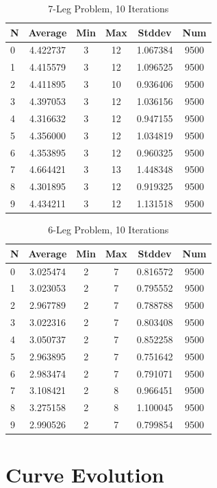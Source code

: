 \documentclass{article}
\begin{document}
\begin{table}
\centering
\begin{tabular}{|l|c|c|c|c|c|}
\hline
N & Average & Min & Max & Stddev & Num \\
\hline
0 & 4.422737 & 3 & 12 & 1.067384 & 9500 \\ 
1 & 4.415579 & 3 & 12 & 1.096525 & 9500 \\ 
2 & 4.411895 & 3 & 10 & 0.936406 & 9500 \\ 
3 & 4.397053 & 3 & 12 & 1.036156 & 9500 \\ 
4 & 4.316632 & 3 & 12 & 0.947155 & 9500 \\ 
5 & 4.356000 & 3 & 12 & 1.034819 & 9500 \\ 
6 & 4.353895 & 3 & 12 & 0.960325 & 9500 \\ 
7 & 4.664421 & 3 & 13 & 1.448348 & 9500 \\ 
8 & 4.301895 & 3 & 12 & 0.919325 & 9500 \\ 
9 & 4.434211 & 3 & 12 & 1.131518 & 9500 \\
\hline
\end{tabular}
\caption{7-Leg Problem, 10 Iterations}
\label{tab:template}
\end{table}

\begin{table}
\centering
\begin{tabular}{|l|c|c|c|c|c|}
\hline
N & Average & Min & Max & Stddev & Num \\
\hline
0 & 3.025474 & 2 & 7 & 0.816572 & 9500 \\ 
1 & 3.023053 & 2 & 7 & 0.795552 & 9500 \\ 
2 & 2.967789 & 2 & 7 & 0.788788 & 9500 \\ 
3 & 3.022316 & 2 & 7 & 0.803408 & 9500 \\ 
4 & 3.050737 & 2 & 7 & 0.852258 & 9500 \\ 
5 & 2.963895 & 2 & 7 & 0.751642 & 9500 \\ 
6 & 2.983474 & 2 & 7 & 0.791071 & 9500 \\ 
7 & 3.108421 & 2 & 8 & 0.966451 & 9500 \\ 
8 & 3.275158 & 2 & 8 & 1.100045 & 9500 \\ 
9 & 2.990526 & 2 & 7 & 0.799854 & 9500 \\
\hline
\end{tabular}
\caption{6-Leg Problem, 10 Iterations}
\label{tab:template}
\end{table}

\clearpage
\section*{Curve Evolution}
\end{document}
